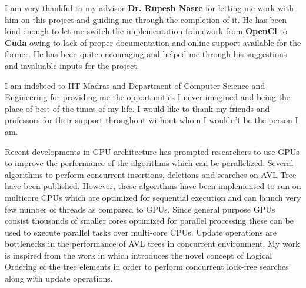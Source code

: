 \documentclass[MTech]{iitmdiss}
\begin{document}
\acknowledgements
I am very thankful to my advisor \textbf{Dr. Rupesh Nasre} for letting me work with him on this project and guiding me through the completion of it. He has been kind enough to let me switch the implementation framework from \textbf{OpenCl} to \textbf{Cuda} owing to lack of proper documentation and online support available for the former. He has been quite encouraging and helped me through his suggestions and invaluable inputs for the project.  

\indent I am indebted to IIT Madras and Department of Computer Science and Engineering for providing me the opportunities I never imagined and being the place of best of the times of my life. I would like to thank my friends and professors for their support throughout without whom I wouldn't be the person I am.       

\abstract

\vspace*{24pt}

\noindent
Recent developments in GPU architecture has prompted researchers to use GPUs to improve the performance of the algorithms which can be parallelized. Several algorithms to perform concurrent insertions, deletions and searches on AVL Tree have been published. However, these algorithms have been implemented to run on multicore CPUs which are optimized for sequential execution and can launch very few number of threads as compared to GPUs. Since general purpose GPUs consist thousands of smaller cores optimized for
parallel processing these can be used to execute parallel tasks over multi-core CPUs. Update operations are bottlenecks in the performance of AVL trees in concurrent environment. My work is inspired from the work in \cite{Logical_Ordering} which introduces the novel concept of Logical Ordering of the tree elements in order to perform concurrent lock-free searches along with update operations. 


\pagebreak


\begin{singlespace}
\tableofcontents
\end{singlespace}

\clearpage

\end{document}
